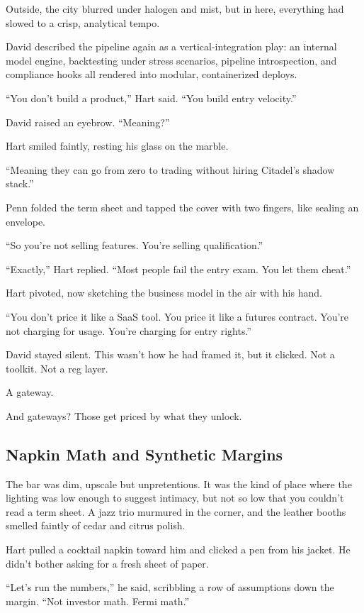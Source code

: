 Outside, the city blurred under halogen and mist, but in here, everything had slowed to a crisp, analytical tempo.

David described the pipeline again as a vertical-integration play:  
an internal model engine, backtesting under stress scenarios, pipeline introspection, and compliance hooks all rendered 
into modular, containerized deploys.

``You don’t build a product,'' Hart said. ``You build entry velocity.''

David raised an eyebrow. ``Meaning?''

Hart smiled faintly, resting his glass on the marble.

``Meaning they can go from zero to trading without hiring Citadel’s shadow stack.''

Penn folded the term sheet and tapped the cover with two fingers, like sealing an envelope.

``So you’re not selling features. You’re selling qualification.''

``Exactly,'' Hart replied. ``Most people fail the entry exam. You let them cheat.''

Hart pivoted, now sketching the business model in the air with his hand.

``You don’t price it like a SaaS tool. You price it like a futures contract.  
You’re not charging for usage. You’re charging for entry rights.''

David stayed silent. This wasn’t how he had framed it, but it clicked.  
Not a toolkit. Not a reg layer.

A gateway.

And gateways? Those get priced by what they unlock.



\subsection{Napkin Math and Synthetic Margins}

The bar was dim, upscale but unpretentious. It was the kind of place where the lighting was low enough to suggest intimacy, 
but not so low that you couldn’t read a term sheet. A jazz trio murmured in the corner, and the leather booths smelled 
faintly of cedar and citrus polish.

Hart pulled a cocktail napkin toward him and clicked a pen from his jacket. He didn’t bother asking for a fresh sheet of paper.

``Let’s run the numbers,'' he said, scribbling a row of assumptions down the margin. ``Not investor math. 
Fermi math.''

